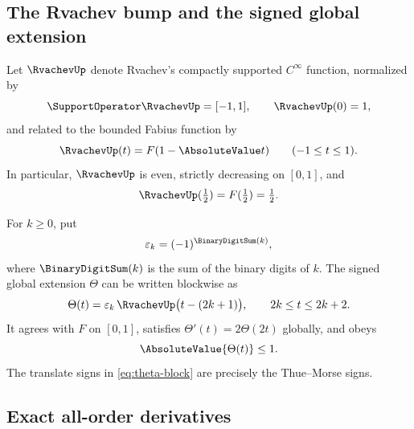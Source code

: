 \documentclass[11pt,oneside]{article}
\theoremstyle{definition}
\theoremstyle{remark}
\newcommand{\eps}{\varepsilon}
\newcommand{\ThetaF}{\Theta}
\newcommand{\half}{\tfrac12}
\begin{document}
\subsection{The Rvachev bump and the signed global extension}

Let $\RvachevUp$ denote Rvachev's compactly supported $C^\infty$ function, normalized by
\[
 \SupportOperator\RvachevUp=[-1,1],\qquad \RvachevUp(0)=1,
\]
and related to the bounded Fabius function by
\begin{equation}
 \RvachevUp(t)=F(1-\AbsoluteValue t)\qquad(-1\leq t\leq1).
 \label{eq:up-F}
\end{equation}
In particular, $\RvachevUp$ is even, strictly decreasing on $[0,1]$, and
\begin{equation}
 \RvachevUp(\half)=F(\half)=\half.
 \label{eq:up-half}
\end{equation}

For $k\geq0$, put
\begin{equation}
  \eps_k=(-1)^{\BinaryDigitSum(k)},
  \label{eq:tm-sign}
\end{equation}
where $\BinaryDigitSum(k)$ is the sum of the binary digits of $k$.  The signed global extension
$\ThetaF$ can be written blockwise as
\begin{equation}
 \ThetaF(t)=\eps_k\,\RvachevUp\bigl(t-(2k+1)\bigr),
 \qquad 2k\leq t\leq2k+2.
 \label{eq:theta-block}
\end{equation}
It agrees with $F$ on $[0,1]$, satisfies $\ThetaF'(t)=2\ThetaF(2t)$ globally, and obeys
\begin{equation}
 \AbsoluteValue{\ThetaF(t)}\leq1.
 \label{eq:theta-bound}
\end{equation}
The translate signs in \eqref{eq:theta-block} are precisely the Thue--Morse signs.

\subsection{Exact all-order derivatives}
\end{document}
